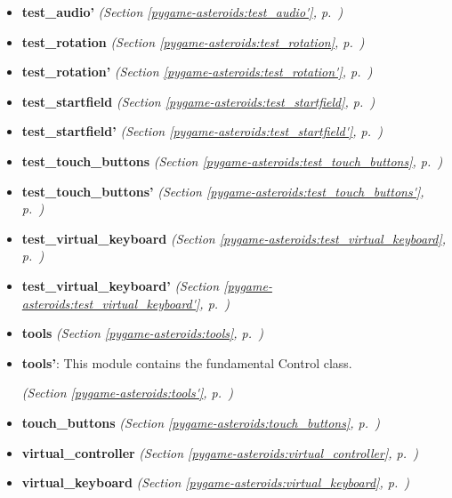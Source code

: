 \begin{itemize}
\item \textbf{test\_audio'}
  \textit{(Section \ref{pygame-asteroids:test_audio'}, p.~\pageref{pygame-asteroids:test_audio'})}

\item \textbf{test\_rotation}
  \textit{(Section \ref{pygame-asteroids:test_rotation}, p.~\pageref{pygame-asteroids:test_rotation})}

\item \textbf{test\_rotation'}
  \textit{(Section \ref{pygame-asteroids:test_rotation'}, p.~\pageref{pygame-asteroids:test_rotation'})}

\item \textbf{test\_startfield}
  \textit{(Section \ref{pygame-asteroids:test_startfield}, p.~\pageref{pygame-asteroids:test_startfield})}

\item \textbf{test\_startfield'}
  \textit{(Section \ref{pygame-asteroids:test_startfield'}, p.~\pageref{pygame-asteroids:test_startfield'})}

\item \textbf{test\_touch\_buttons}
  \textit{(Section \ref{pygame-asteroids:test_touch_buttons}, p.~\pageref{pygame-asteroids:test_touch_buttons})}

\item \textbf{test\_touch\_buttons'}
  \textit{(Section \ref{pygame-asteroids:test_touch_buttons'}, p.~\pageref{pygame-asteroids:test_touch_buttons'})}

\item \textbf{test\_virtual\_keyboard}
  \textit{(Section \ref{pygame-asteroids:test_virtual_keyboard}, p.~\pageref{pygame-asteroids:test_virtual_keyboard})}

\item \textbf{test\_virtual\_keyboard'}
  \textit{(Section \ref{pygame-asteroids:test_virtual_keyboard'}, p.~\pageref{pygame-asteroids:test_virtual_keyboard'})}

\item \textbf{tools}
  \textit{(Section \ref{pygame-asteroids:tools}, p.~\pageref{pygame-asteroids:tools})}

\item \textbf{tools'}: This module contains the fundamental Control class.



  \textit{(Section \ref{pygame-asteroids:tools'}, p.~\pageref{pygame-asteroids:tools'})}

\item \textbf{touch\_buttons}
  \textit{(Section \ref{pygame-asteroids:touch_buttons}, p.~\pageref{pygame-asteroids:touch_buttons})}

\item \textbf{virtual\_controller}
  \textit{(Section \ref{pygame-asteroids:virtual_controller}, p.~\pageref{pygame-asteroids:virtual_controller})}

\item \textbf{virtual\_keyboard}
  \textit{(Section \ref{pygame-asteroids:virtual_keyboard}, p.~\pageref{pygame-asteroids:virtual_keyboard})}

\end{itemize}


